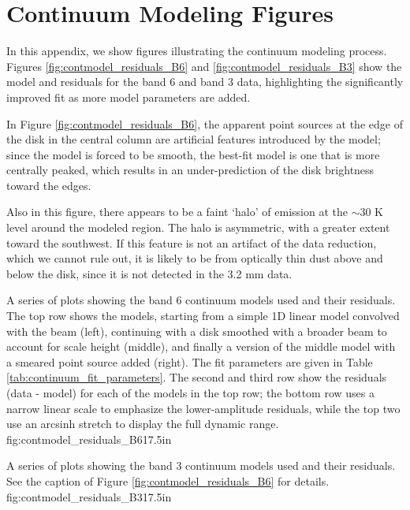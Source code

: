 \documentclass[twocolumn]{aastex61}
\begin{document}
\section{Continuum Modeling Figures}
\label{appendix:contmodel}
In this appendix, we show figures illustrating the continuum modeling process.
Figures \ref{fig:contmodel_residuals_B6} and \ref{fig:contmodel_residuals_B3}
show the model and residuals for the band 6 and band 3 data, highlighting the
significantly improved fit as more model parameters are added.

In Figure \ref{fig:contmodel_residuals_B6}, the apparent point sources at the
edge of the disk in the central column are artificial features introduced by
the model; since the model is forced to be smooth, the best-fit model is one
that is more centrally peaked, which results in an under-prediction of the disk
brightness toward the edges.  

Also in this figure, there appears to be a faint `halo' of emission at the
$\sim30$ K level around the modeled region.  The halo is asymmetric, with a
greater extent toward the southwest.  If this feature is not an artifact of the
data reduction, which we cannot rule out, it is likely to be from optically
thin dust above and below the disk, since it is not detected in the 3.2 mm data.


{A series of plots showing the band 6 continuum models used and their residuals.
The top row shows the models, starting from a simple 1D linear model convolved
with the beam (left), continuing with a disk smoothed with a broader beam to
account for scale height (middle), and finally a version of the middle model
with a smeared point source added (right).  The fit parameters are given in Table
\ref{tab:continuum_fit_parameters}.  The second and third row show the
residuals (data - model) for each of the models in the top row; the bottom row
uses a narrow linear scale to emphasize the lower-amplitude residuals, while
the top two use an arcsinh stretch to display the full dynamic range.
}
{fig:contmodel_residuals_B6}{1}{7.5in}


{A series of plots showing the band 3 continuum models used and their residuals.
See the caption of Figure \ref{fig:contmodel_residuals_B6} for details.
}
{fig:contmodel_residuals_B3}{1}{7.5in}
\end{document}

